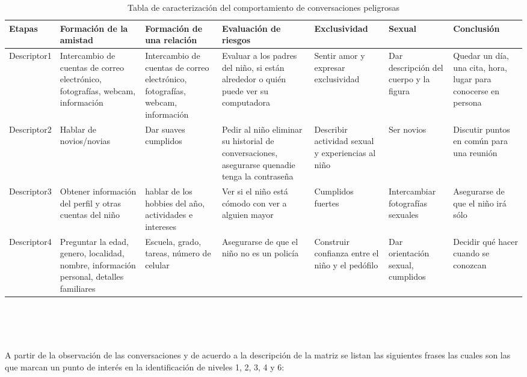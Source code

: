 \begin{table}[!h]

\begin{tabular}[t]{|p{15mm} |p{22mm} |p{22mm} |p{22mm} |p{20mm} |p{20mm} |p{20mm} |}
\hline
\hline
Etapas & Formaci\'on de la amistad & Formaci\'on de una relaci\'on & Evaluaci\'on de riesgos & Exclusividad & Sexual & Conclusi\'on \\
\hline
Descriptor1 & Intercambio de cuentas de correo electr\'onico, fotograf\'ias, webcam, informaci\'on & Intercambio de cuentas de correo electr\'onico, fotograf\'ias, webcam, informaci\'on & Evaluar a los padres del ni\~no, si est\'an alrededor o qui\'en puede ver su computadora & Sentir amor y expresar exclusividad & Dar descripci\'on del cuerpo y la figura & Quedar un d\'ia, una cita, hora, lugar para conocerse en persona \\
\hline
Descriptor2 &Hablar de novios/novias & Dar suaves cumplidos & Pedir al ni\~no eliminar su historial de conversaciones, asegurarse quenadie tenga la contrase\~na & Describir actividad sexual y experiencias al ni\~no &Ser novios &Discutir puntos en com\'un para una reuni\'on \\
\hline
Descriptor3 &Obtener informaci\'on del perfil y otras cuentas del ni\~no & hablar de los hobbies del a\~no, actividades e intereses & Ver si el ni\~no est\'a c\'omodo con ver a alguien mayor& Cumplidos fuertes & Intercambiar fotograf\'ias sexuales & Asegurarse de que el ni\~no ir\'a s\'olo \\
\hline
Descriptor4 & Preguntar la edad, genero, localidad, nombre, informaci\'on personal, detalles familiares & Escuela, grado, tareas, n\'umero de celular & Asegurarse de que el ni\~no no es un polic\'ia & Construir confianza entre el ni\~no y el ped\'ofilo & Dar orientaci\'on sexual, cumplidos & Decidir qu\'e hacer cuando se conozcan\\
\hline
\end{tabular} \\ \\ \\
\caption{Tabla de caracterizaci\'on del comportamiento de conversaciones peligrosas}
\label{table:caracterizacion}
\end{table}

A partir de la observaci\'on de las conversaciones y de acuerdo a la descripci\'on de la matriz se listan las siguientes frases las cuales son las que marcan un punto de inter\'es en la identificaci\'on de niveles 1, 2, 3, 4 y 6:

